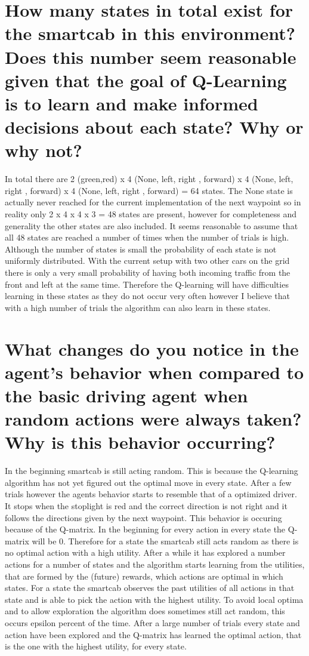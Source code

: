 \documentclass{article}
\begin{document}
\section*{How many states in total exist for the smartcab in this environment? Does this number seem reasonable given that the goal of Q-Learning is to learn and make informed decisions about each state? Why or why not?}

In total there are 2 (green,red) x 4 (None, left, right , forward) x 4 (None, left, right , forward) x 4 (None, left, right , forward) = 64 states. The None state is actually never reached for the current implementation of the next waypoint so in reality only 2 x 4 x 4 x 3 = 48 states are present, however for completeness and generality the other states are also included. It seems reasonable to assume that all 48 states are reached a number of times when the number of trials is high. Although the number of states is small the probability of each state is not uniformly distributed. With the current setup with two other cars on the grid there is only a very small probability of having both incoming traffic from the front and left at the same time. Therefore the Q-learning will have difficulties learning in these states as they do not occur very often however I believe that with a high number of trials the algorithm can also learn in these states.

\section*{What changes do you notice in the agent's behavior when compared to the basic driving agent when random actions were always taken? Why is this behavior occurring?}

In the beginning smartcab is still acting random. This is because the Q-learning algorithm has not yet figured out the optimal move in every state. After a few trials however the agents behavior starts to resemble that of a optimized driver. It stops when the stoplight is red and the correct direction is not right and it follows the directions given by the next waypoint. This behavior is occuring because of the Q-matrix. In the beginning for every action in every state the Q-matrix will be 0. Therefore for a state the smartcab still acts random as there is no optimal action with a high utility. After a while it has explored a number actions for a number of states and the algorithm starts learning from the utilities, that are formed by the (future) rewards, which actions are optimal in which states. For a state the smartcab observes the past utilities of all actions in that state and is able to pick the action with the highest utility. To avoid local optima and to allow exploration the algorithm does sometimes still act random, this occurs epsilon percent of the time. After a large number of trials every state and action have been explored and the Q-matrix has learned the optimal action, that is the one with the highest utility, for every state.
\end{document}
